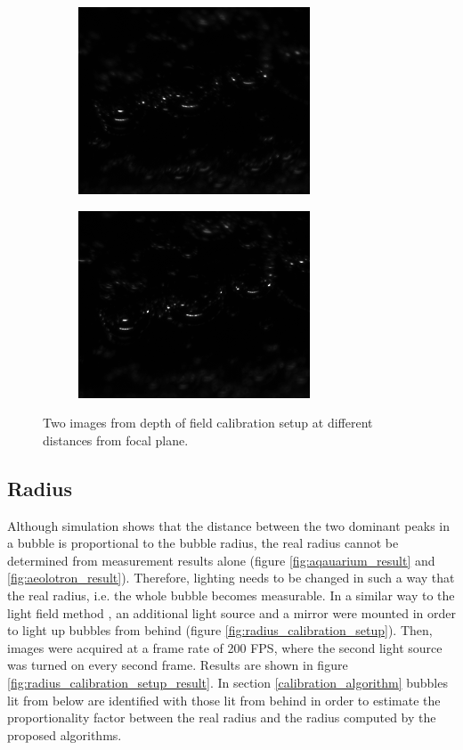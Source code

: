 			\begin{figure}
				\begin{subfigure}[b]{.55\textwidth}
					\centering
					\includegraphics[scale=.5]{images/dof_calib_1.png}
					\caption{}
				\end{subfigure}%
				\begin{subfigure}[b]{.55\textwidth}
					\centering
					\includegraphics[scale=.5]{images/dof_calib_2.png}
					\caption{}
				\end{subfigure}
				
				\caption{Two images from depth of field calibration setup at different distances from focal plane.}								
				\label{fig:depth_of_field_setup_result}
			\end{figure}
			
			
		\subsection{Radius}\label{sub:radius_setup}
			Although simulation shows that the distance between the two dominant peaks in a bubble is proportional to the bubble radius, the real radius cannot be determined from measurement results alone (figure \ref{fig:aqauarium_result} and \ref{fig:aeolotron_result}). Therefore, lighting needs to be changed in such a way that the real radius, i.e. the whole bubble becomes measurable. In a similar way to the light field method \cite{MischlerDiss}, an additional light source and a mirror were mounted in order to light up bubbles from behind (figure \ref{fig:radius_calibration_setup}). Then, images were acquired at a frame rate of 200 FPS, where the second light source was turned on every second frame. Results are shown in figure \ref{fig:radius_calibration_setup_result}. In section \ref{calibration_algorithm} bubbles lit from below are identified with those lit from behind in order to estimate the proportionality factor between the real radius and the radius computed by the proposed algorithms. 
			


